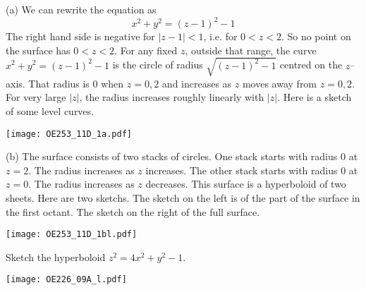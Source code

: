 \begin{solution} (a)
We can rewrite the equation as 
\begin{equation*}
x^2 + y^2 = (z-1)^2 - 1
\end{equation*}
The right hand side is negative for $|z-1|<1$, i.e. for $0<z<2$.
So no point on the surface has $0<z<2$. For any 
fixed $z$, outside that range, the curve $x^2 + y^2 = (z-1)^2 - 1$ 
is the circle of radius $\sqrt{(z-1)^2 - 1}$ centred on the $z$--axis.
That radius is $0$ when $z=0,2$ and increases as $z$ moves away from 
$z=0,2$. For very large $|z|$, the radius increases roughly linearly with
$|z|$. Here is a sketch of some level curves.

\begin{center}
     \texttt{[image: OE253\_11D\_1a.pdf]}
\end{center}

(b)
The surface consists of two stacks of circles. 
One stack starts with radius $0$ at $z=2$. 
The radius increases as $z$ increases.
The other stack starts with radius $0$ at $z=0$. 
The radius increases as $z$ decreases.
This surface is a hyperboloid of two sheets. Here are two
sketchs. The sketch on the left is of the part of the surface in the
first octant. The sketch on the right of the full surface.

\begin{center}
   \texttt{[image: OE253\_11D\_1bl.pdf]}\qquad\qquad
\end{center}

\end{solution}

\begin{question}[M226 2009A] %
Sketch the hyperboloid $z^2=4x^2+y^2-1$.
\end{question}

%

\begin{answer}
\begin{center}
   \texttt{[image: OE226\_09A\_l.pdf]}\qquad\qquad
\end{center}
\end{answer}


